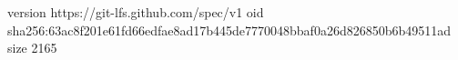 version https://git-lfs.github.com/spec/v1
oid sha256:63ac8f201e61fd66edfae8ad17b445de7770048bbaf0a26d826850b6b49511ad
size 2165

